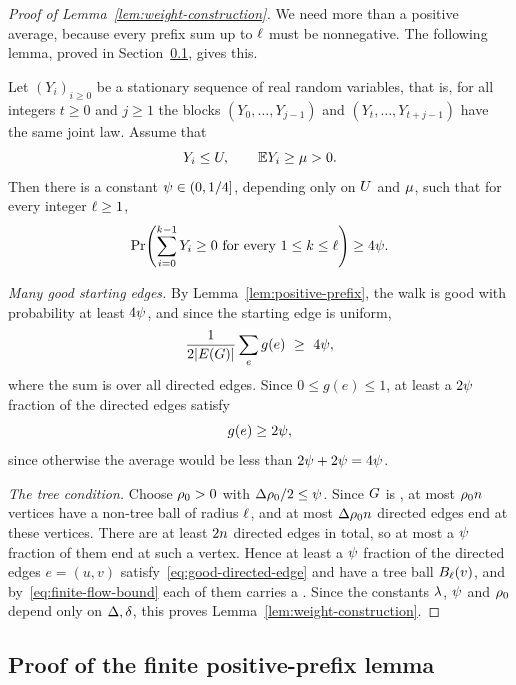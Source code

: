 \begin{proof}[Proof of Lemma~\ref{lem:weight-construction}]
We need more than a positive average, because every prefix sum up to \(\ell\)
must be nonnegative. The following lemma, proved in
Section~\ref{subsec:positive-prefix}, gives this.

\begin{lemma}\label{lem:positive-prefix}
Let \((Y_i)_{i\ge0}\) be a stationary sequence of real random variables, that
is, for all integers \(t\ge0\) and \(j\ge1\) the blocks
\((Y_0,\ldots,Y_{j-1})\) and \((Y_t,\ldots,Y_{t+j-1})\) have the same joint
law. Assume that
\[
  Y_i\le U,
  \qquad
  \mathbb{E} Y_i\ge\mu>0 .
\]
Then there is a constant \(\psi\in(0,1/4]\), depending only on \(U\) and
\(\mu\), such that for every integer \(\ell\ge1\),
\begin{equation}\label{eq:positive-prefix}
  \Prx{\sum_{i=0}^{k-1}Y_i\ge0\text{ for every }1\le k\le \plen}
  \ge 4\gfrac.
\end{equation}
\end{lemma}

\emph{Many good starting edges.} By Lemma~\ref{lem:positive-prefix}, the walk
is good with probability at least \(4\psi\), and since the starting edge is
uniform,
\[
  \frac{1}{2|E(\Gin)|}\sum_{e}g(e)\ \ge\ 4\gfrac ,
\]
where the sum is over all directed edges. Since \(0\le g(e)\le1\), at least a
\(2\psi\) fraction of the directed edges satisfy
\begin{equation}\label{eq:good-directed-edge}
  g(e)\ge2\psi,
\end{equation}
since otherwise the average would be less than \(2\psi+2\psi=4\psi\).

\emph{The tree condition.} Choose \(\rho_0>0\) with
\(\Delta\rho_0/2\le\psi\). Since \(G\) is \loctree{\plen}{\nontreez}, at
most \(\rho_0n\) vertices have a non-tree ball of radius \(\ell\), and
at most \(\Delta\rho_0n\) directed edges end at these vertices. There are
at least \(2n\) directed edges in total, so at most a \(\psi\) fraction
of them end at such a vertex. Hence at least a \(\psi\) fraction of the
directed edges \(e=(u,v)\) satisfy~\eqref{eq:good-directed-edge} and have a
tree ball \(B_{\ell}(v)\), and by~\eqref{eq:finite-flow-bound} each of them
carries a \flowt{\brnum}{\gfrac}. Since the constants \(\lambda\), \(\psi\)
and \(\rho_0\) depend only on \(\Delta,\delta\), this proves
Lemma~\ref{lem:weight-construction}.
\end{proof}


\subsection{Proof of the finite positive-prefix lemma}
\label{subsec:positive-prefix}

